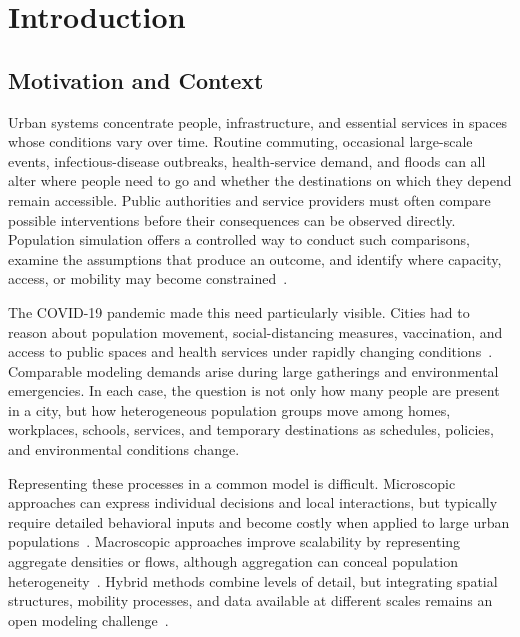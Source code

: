 \chapter{Introduction}
\label{chapter:introduction}

\section{Motivation and Context}
\label{sec:introduction_motivation}

Urban systems concentrate people, infrastructure, and essential services in spaces whose conditions vary over time. Routine commuting, occasional large-scale events, infectious-disease outbreaks, health-service demand, and floods can all alter where people need to go and whether the destinations on which they depend remain accessible. Public authorities and service providers must often compare possible interventions before their consequences can be observed directly. Population simulation offers a controlled way to conduct such comparisons, examine the assumptions that produce an outcome, and identify where capacity, access, or mobility may become constrained~\cite{eid1980,tekouabou2022MLinUrbanPlanning,haraguchi2022mobilityDataReview,serana2023multilevelmodeling}.

The COVID-19 pandemic made this need particularly visible. Cities had to reason about population movement, social-distancing measures, vaccination, and access to public spaces and health services under rapidly changing conditions~\cite{shafiri2020covidImpact,kang2021hybridCovid,bouchnita2021mathModelCovid}. Comparable modeling demands arise during large gatherings and environmental emergencies. In each case, the question is not only how many people are present in a city, but how heterogeneous population groups move among homes, workplaces, schools, services, and temporary destinations as schedules, policies, and environmental conditions change.

Representing these processes in a common model is difficult. Microscopic approaches can express individual decisions and local interactions, but typically require detailed behavioral inputs and become costly when applied to large urban populations~\cite{helbing1995social,cao2021competitiveCooperative,khan2024heterogeneousSurvey,ruprecht2024adaptiveMovement}. Macroscopic approaches improve scalability by representing aggregate densities or flows, although aggregation can conceal population heterogeneity~\cite{hughes2002continuum,treuille2006continuum,thalmann2007crowd}. Hybrid methods combine levels of detail, but integrating spatial structures, mobility processes, and data available at different scales remains an open modeling challenge~\cite{xiong2010hybrid,ijaz2015hybridSurvey,antonitsch2019bioclouds,dang2023multilevelCrowd,cogo2019integrability,alessandretti2020nature}.

